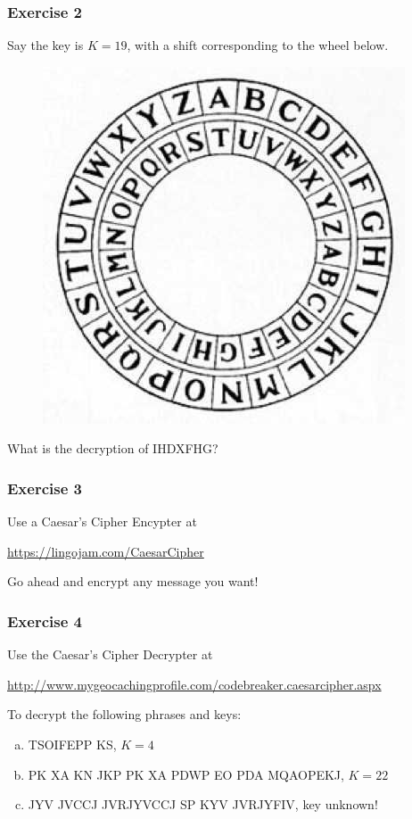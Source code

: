 \documentclass{beamer}
\newcommand{\<}{\langle}
\renewcommand{\>}{\rangle}
\begin{document}
\begin{frame}
\frametitle{Exercise 2}

Say the key is $K = 19$, with a shift corresponding to the wheel below. 
\begin{figure}
\includegraphics[scale=.3]{IMG/wheel2.jpg}
\end{figure}

What is the decryption of IHDXFHG?
\end{frame}


\begin{frame}
\frametitle{Exercise 3}

Use a Caesar's Cipher Encypter at 
\begin{center}
\url{https://lingojam.com/CaesarCipher}
\end{center}

Go ahead and encrypt any message you want! 
\end{frame}

\begin{frame}
\frametitle{Exercise 4}

Use the Caesar's Cipher Decrypter at
\begin{center}
\url{http://www.mygeocachingprofile.com/codebreaker.caesarcipher.aspx}
\end{center}

To decrypt the following phrases and keys:
\begin{enumerate}[(a)]
\item
TSOIFEPP KS, $K=4$

\item 
PK XA KN JKP PK XA PDWP EO PDA MQAOPEKJ, $K=22$

\item 
JYV JVCCJ JVRJYVCCJ SP KYV JVRJYFIV, key unknown!
\end{enumerate}
\end{frame}
\end{document}
